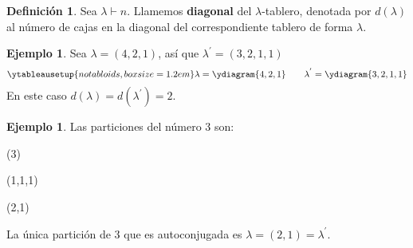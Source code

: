 \documentclass[12pt]{book}
\theoremstyle{definition}
\newtheorem{definition}[theorem]{Definición}
\newtheorem{example}[theorem]{Ejemplo}
\newcounter{in}
\newcounter{ini}
\begin{document}
\begin{definition}
  Sea $\lambda\vdash n$. Llamemos \textbf{diagonal} del
  $\lambda$-tablero, denotada por $d(\lambda)$ al número de
  cajas en la diagonal del correspondiente tablero de forma $\lambda$.
\end{definition}

\begin{example}
  Sea $\lambda=(4,2,1)$, así que $\lambda^{'}=(3,2,1,1)$
  \begin{equation*}
    \ytableausetup{notabloids,boxsize=1.2em} 
    \lambda=\ydiagram{4,2,1} \qquad
    \lambda^{'}=\ydiagram{3,2,1,1}
  \end{equation*}
  En este caso $d(\lambda)=d(\lambda^{'})=2$.
\end{example}

\begin{example}Las particiones del número 3 son:
  \begin{center}
    \begin{minipage}[h]{0.3\linewidth}
      \centering {}

      (3)
    \end{minipage}
    \begin{minipage}[h]{0.3\linewidth}
      \centering {}

      (1,1,1)
    \end{minipage}
    \begin{minipage}[h]{0.3\linewidth}
      \centering {}
      
      (2,1)
    \end{minipage}
  \end{center}
 La única partición de 3 que es autoconjugada es $\lambda=(2,1)=\lambda^{'}$.
\end{example}
\end{document}
